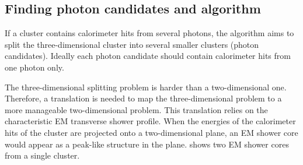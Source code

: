 


\subsection{Finding photon candidates and \peakFinding algorithm}
\label{sec:peakFinding}
If a cluster contains calorimeter hits from several photons, the algorithm aims to split the three-dimensional cluster into several smaller clusters (photon candidates). Ideally each photon candidate should contain calorimeter hits from one photon only.


The three-dimensional splitting problem is harder than a two-dimensional one. Therefore, a translation is needed to map the three-dimensional problem to a more manageable two-dimensional problem. This translation relies on the characteristic EM transverse shower profile. When the energies of the calorimeter hits of the cluster are projected onto a two-dimensional plane, an EM shower core would appear as a peak-like structure in the plane.  shows two EM shower cores from a single cluster.






